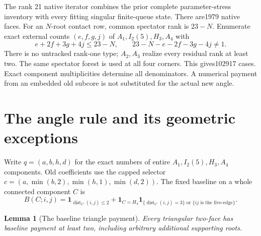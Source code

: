 \documentclass[11pt]{article}
\newtheorem{lemma}[theorem]{Lemma}
\begin{document}
The rank 21 native iterator combines the prior complete parameter-stress
inventory with every fitting singular finite-queue state. There are1979
native faces. For an $N$-root contact row, common spectator rank is
$23-N$. Enumerate exact external counts $(e,f,g,j)$ of
$A_1,I_2(5),H_3,A_4$ with
\[
 e+2f+3g+4j\le23-N,\qquad
 23-N-e-2f-3g-4j\ne1.
\]
There is no untracked rank-one type; $A_2,A_3$ realize every residual
rank at least two. The same spectator forest is used at all four
corners. This gives102917 cases. Exact component multiplicities determine
all denominators. A numerical payment from an embedded old subcore is
not substituted for the actual new angle.

\section{The angle rule and its geometric exceptions}
Write $q=(a,b,h,d)$ for the exact numbers of entire
$A_1,I_2(5),H_3,A_4$ components. Old coefficients use the capped selector
$c=(a,\min(b,2),\min(h,1),\min(d,2))$.
The fixed baseline on a whole connected component $C$ is
\[
 B(C;i,j)=\mathbf1_{\operatorname{dist}_C(i,j)\le2}
 +\mathbf1_{C=H_4}\mathbf1_{\{\operatorname{dist}_C(i,j)=3\}
                      \text{ or }\{ij\text{ is the five-edge}\}}.
\]
\begin{lemma}[The baseline triangle payment]\label{lem:triangles}
Every triangular two-face has baseline payment at least two, including
arbitrary additional supporting roots.
\end{lemma}
\end{document}
